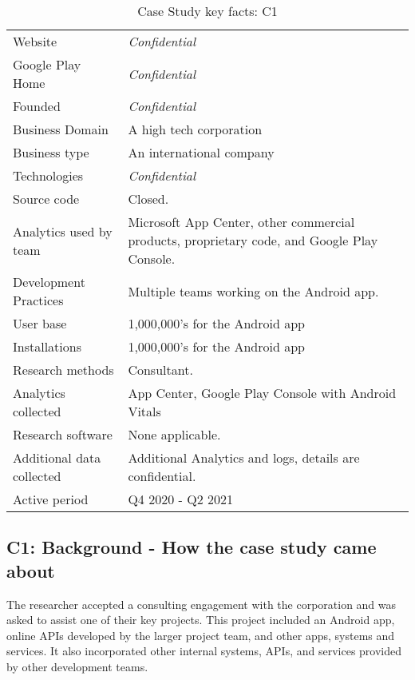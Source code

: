 {\renewcommand{\arraystretch}{0.8}%
\begin{table*}
    \centering
    \small
    \setlength{\tabcolsep}{6pt}
    \begin{tabular}{lp{9cm}}
       \toprule
       Website &\textit{Confidential} \\
       Google Play Home & \textit{Confidential} \\
       Founded & \textit{Confidential} \\
       Business Domain & A high tech corporation \\
       Business type & An international company \\
       Technologies  & \textit{Confidential} \\
       Source code  &Closed. \\
       Analytics used by team & Microsoft App Center, other commercial products, proprietary code, and Google Play Console. \\
       Development Practices & Multiple teams working on the Android app. \\
       \midrule
       User base & 1,000,000's for the Android app \\
       Installations & 1,000,000's for the Android app \\
       \midrule
       Research methods &Consultant. \\
       Analytics collected &App Center, Google Play Console with Android Vitals \\
       Research software & None applicable. \\
       Additional data collected &Additional Analytics and logs, details are confidential. \\
       Active period & Q4 2020 - Q2 2021 \\
       \bottomrule
    \end{tabular}
    \caption{Case Study key facts: C1}
    \label{tab:commercial_case_study_anaytics_overview}
\end{table*}
}

\subsection{C1: Background - How the case study came about}
The researcher accepted a consulting engagement with the corporation and was asked to assist one of their key projects. This project included an Android app, online APIs developed by the larger project team, and other apps, systems and services. It also incorporated other internal systems, APIs, and services provided by other development teams. 

